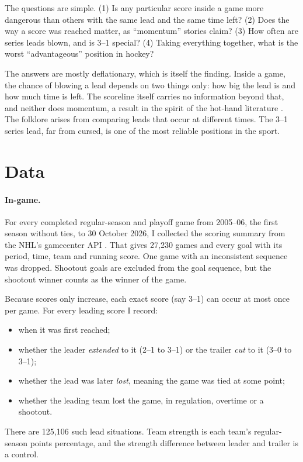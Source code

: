 \documentclass[11pt]{article}
\begin{document}
The questions are simple. (1) Is any particular score inside a game more dangerous than others with the same lead and the same time left? (2) Does the way a score was reached matter, as ``momentum'' stories claim? (3) How often are series leads blown, and is 3--1 special? (4) Taking everything together, what is the worst ``advantageous'' position in hockey?

The answers are mostly deflationary, which is itself the finding. Inside a game, the chance of blowing a lead depends on two things only: how big the lead is and how much time is left. The scoreline itself carries no information beyond that, and neither does momentum, a result in the spirit of the hot-hand literature \citep{gvt1985,millersanjurjo2018}. The folklore arises from comparing leads that occur at different times. The 3--1 series lead, far from cursed, is one of the most reliable positions in the sport.

\section{Data}

\paragraph{In-game.} For every completed regular-season and playoff game from 2005--06, the first season without ties, to 30 October 2026, I collected the scoring summary from the NHL's gamecenter API \citep{nhlapi}. That gives 27,230 games and every goal with its period, time, team and running score. One game with an inconsistent sequence was dropped. Shootout goals are excluded from the goal sequence, but the shootout winner counts as the winner of the game.

Because scores only increase, each exact score (say 3--1) can occur at most once per game. For every leading score I record:
\begin{itemize}[itemsep=1pt]
\item when it was first reached;
\item whether the leader \emph{extended} to it (2--1 to 3--1) or the trailer \emph{cut} to it (3--0 to 3--1);
\item whether the lead was later \emph{lost}, meaning the game was tied at some point;
\item whether the leading team lost the game, in regulation, overtime or a shootout.
\end{itemize}
There are 125,106 such lead situations. Team strength is each team's regular-season points percentage, and the strength difference between leader and trailer is a control.
\end{document}
